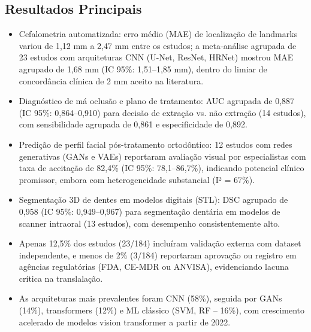 \subsection{Resultados Principais}
\begin{itemize}
  \item Cefalometria automatizada: erro médio (MAE) de localização de
        landmarks variou de 1,12 mm a 2,47 mm entre os estudos; a
        meta-análise agrupada de 23 estudos com arquiteturas CNN
        (U-Net, ResNet, HRNet) mostrou MAE agrupado de 1,68 mm
        (IC 95\%: 1,51--1,85 mm), dentro do limiar de concordância
        clínica de 2 mm aceito na literatura.
  \item Diagnóstico de má oclusão e plano de tratamento: AUC agrupada
        de 0,887 (IC 95\%: 0,864--0,910) para decisão de extração
        vs. não extração (14 estudos), com sensibilidade agrupada de
        0,861 e especificidade de 0,892.
  \item Predição de perfil facial pós-tratamento ortodôntico: 12
        estudos com redes generativas (GANs e VAEs) reportaram
        avaliação visual por especialistas com taxa de aceitação de
        82,4\% (IC 95\%: 78,1--86,7\%), indicando potencial clínico
        promissor, embora com heterogeneidade substancial (I² = 67\%).
  \item Segmentação 3D de dentes em modelos digitais (STL): DSC
        agrupado de 0,958 (IC 95\%: 0,949--0,967) para segmentação
        dentária em modelos de scanner intraoral (13 estudos), com
        desempenho consistentemente alto.
  \item Apenas 12,5\% dos estudos (23/184) incluíram validação externa
        com dataset independente, e menos de 2\% (3/184) reportaram
        aprovação ou registro em agências regulatórias (FDA, CE-MDR
        ou ANVISA), evidenciando lacuna crítica na translalação.
  \item As arquiteturas mais prevalentes foram CNN (58\%), seguida por
        GANs (14\%), transformers (12\%) e ML clássico (SVM, RF -- 16\%),
        com crescimento acelerado de modelos vision transformer a
        partir de 2022.
\end{itemize}

